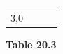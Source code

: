 {{\begin{center}
\begin{xtabular}[t]{|l|l|l|l|}
         &
    
    
         &
    
    
     \tabularnewline{}
    
    
        3,0 &
    
    
         &
    
    
         &
    
    
     \tabularnewline{}
    \end{xtabular}
      \end{center}
    \begin{center}{\small\bfseries Table 20.3}\end{center}
    
    \addtocounter{footnote}{-0}
    
}}
